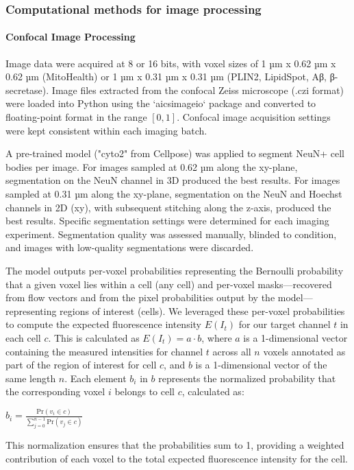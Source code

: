 
\subsubsection{Computational methods for image processing}

\paragraph{Confocal Image Processing}
Image data were acquired at 8 or 16 bits, with voxel sizes of 1 µm x 0.62 µm x 0.62 µm (MitoHealth) or 1 µm x 0.31 µm x 0.31 µm (PLIN2, LipidSpot, Aβ, β-secretase). Image files extracted from the confocal Zeiss microscope (.czi format) were loaded into Python using the `aicsimageio` package and converted to floating-point format in the range $[0,1]$. Confocal image acquisition settings were kept consistent within each imaging batch.

A pre-trained model ("cyto2" from Cellpose\cite{Stringer2021-ek}) was applied to segment NeuN+ cell bodies per image. For images sampled at 0.62 µm along the xy-plane, segmentation on the NeuN channel in 3D produced the best results. For images sampled at 0.31 µm along the xy-plane, segmentation on the NeuN and Hoechst channels in 2D (xy), with subsequent stitching along the z-axis, produced the best results. Specific segmentation settings were determined for each imaging experiment. Segmentation quality was assessed manually, blinded to condition, and images with low-quality segmentations were discarded.

The model outputs per-voxel probabilities representing the Bernoulli probability that a given voxel lies within a cell (any cell) and per-voxel masks—recovered from flow vectors and from the pixel probabilities output by the model—representing regions of interest (cells). We leveraged these per-voxel probabilities to compute the expected fluorescence intensity $E(I_t)$ for our target channel $t$ in each cell $c$. This is calculated as $E(I_t) = a \cdot b$, where $a$ is a 1-dimensional vector containing the measured intensities for channel $t$ across all $n$ voxels annotated as part of the region of interest for cell $c$, and $b$ is a 1-dimensional vector of the same length $n$. Each element $b_i$ in $b$ represents the normalized probability that the corresponding voxel $i$ belongs to cell $c$, calculated as:

$b_i = \frac{\text{Pr}(v_i \in c)}{\sum_{j=0}^{n-1} \text{Pr}(v_j \in c)}$

This normalization ensures that the probabilities sum to 1, providing a weighted contribution of each voxel to the total expected fluorescence intensity for the cell.


